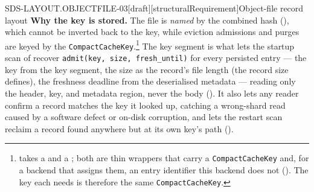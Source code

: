 \begin{requirement}{SDS-LAYOUT.OBJECTFILE-03}[draft][structuralRequirement]{Object-file record layout}
  \textbf{Why the key is stored.} The file is \emph{named} by the combined
  hash (), which cannot be inverted back to the
  key, while eviction admissions and purges are keyed by the
  \texttt{CompactCacheKey}.\footnote{
  takes a  and
   a
  ; both are thin
  wrappers that carry a \texttt{CompactCacheKey} and, for a backend that assigns
  them, an entry identifier this backend does not
  (). The key each needs is therefore the same
  \texttt{CompactCacheKey}.} The key segment is what lets the startup scan of
   recover \texttt{admit(key, size,
  fresh\_until)} for every persisted entry --- the key from the key segment,
  the size as the record's file length (the record size
   defines), the freshness deadline from the
  deserialised metadata --- reading only the header, key, and metadata region,
  never the body (). It also lets any
  reader confirm a record matches the key it looked up, catching a
  wrong-shard read caused by a software defect or on-disk corruption, and
  lets the restart scan reclaim a record found anywhere but at its own key's
  path ().


\end{requirement}
